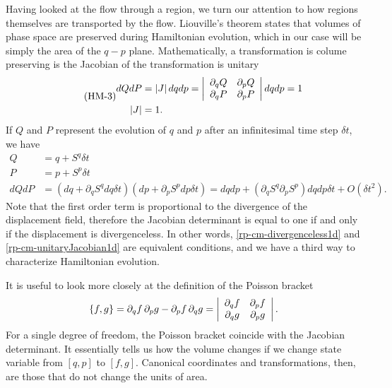 Having looked at the flow through a region, we turn our attention to how regions themselves are transported by the flow. Liouville's theorem states that volumes of phase space are preserved during Hamiltonian evolution, which in our case will be simply the area of the $q-p$ plane. Mathematically, a transformation is colume preserving is the Jacobian of the transformation is unitary
\begin{equation}\label{rp-cm-unitaryJacobian1d}
	\tag{HM-3}
	\begin{aligned}
		dQ dP &= \left|J\right| dq dp = \left|\begin{array}{ c c }
		\partial_q Q & \partial_p Q \\
		\partial_q P & \partial_p P \\
		\end{array} \right| dq dp = 1 \\
		\left| J \right| &= 1.
	\end{aligned}	
\end{equation}
If $Q$ and $P$ represent the evolution of $q$ and $p$ after an infinitesimal time step $\delta t$, we have
\begin{equation}
	\begin{aligned}
	Q &= q + S^q \delta t \\ 
	P &= p + S^p \delta t \\ 
	dQ dP &= (dq + \partial_q S^q dq \delta t) (dp + \partial_p S^p dp \delta t) = dqdp + \left(\partial_q S^q \partial_p S^p \right) dq dp \delta t + O(\delta t^2). 
	\end{aligned}
\end{equation}
Note that the first order term is proportional to the divergence of the displacement field, therefore the Jacobian determinant is equal to one if and only if the displacement is divergenceless. In other words, \ref{rp-cm-divergenceless1d} and \ref{rp-cm-unitaryJacobian1d} are equivalent conditions, and we have a third way to characterize Hamiltonian evolution.

It is useful to look more closely at the definition of the Poisson bracket
\begin{equation}
	\{f, g\} = \partial_q f \, \partial_p g - \partial_p f \, \partial_q g = \left|\begin{array}{ c c }
		\partial_q f & \partial_p f \\
		\partial_q g & \partial_p g \\
	\end{array} \right|.
\end{equation}
For a single degree of freedom, the Poisson bracket coincide with the Jacobian determinant. It essentially tells us how the volume changes if we change state variable from $[q, p]$ to $[f, g]$. Canonical coordinates and transformations, then, are those that do not change the units of area.

